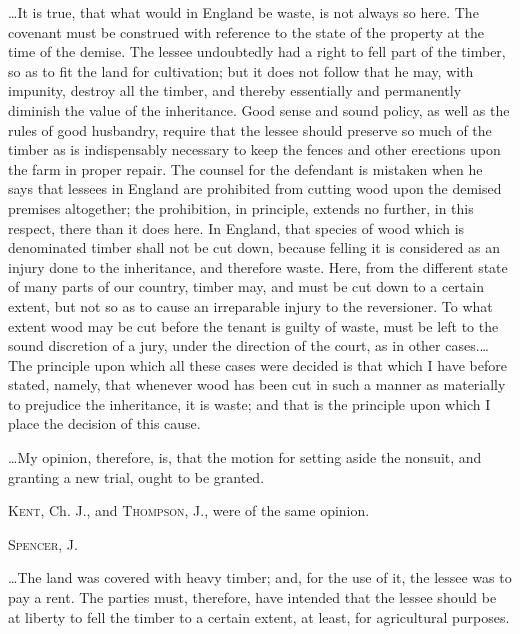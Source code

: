 \dots It is true, that what would in England be waste, is not always so here.
The covenant must be construed with reference to the state of the property at
the time of the demise. The lessee undoubtedly had a right to fell part of the
timber, so as to fit the land for cultivation; but it does not follow that he
may, with impunity, destroy all the timber, and thereby essentially and
permanently diminish the value of the inheritance. Good sense and sound policy,
as well as the rules of good husbandry, require that the lessee should preserve
so much of the timber as is indispensably necessary to keep the fences and
other erections upon the farm in proper repair. The counsel for the defendant
is mistaken when he says that lessees in England are prohibited from cutting
wood upon the demised premises altogether; the prohibition, in principle,
extends no further, in this respect, there than it does here. In England, that
species of wood which is denominated timber shall not be cut down, because
felling it is considered as an injury done to the inheritance, and therefore
waste. Here, from the different state of many parts of our country, timber may,
and must be cut down to a certain extent, but not so as to cause an irreparable
injury to the reversioner. To what extent wood may be cut before the tenant is
guilty of waste, must be left to the sound discretion of a jury, under the
direction of the court, as in other cases.\dots The principle upon which all
these cases were decided is that which I have before stated, namely, that
whenever wood has been cut in such a manner as materially to prejudice the
inheritance, it is waste; and that is the principle upon which I place the
decision of this cause.

\dots My opinion, therefore, is, that the motion for setting aside the nonsuit,
and granting a new trial, ought to be granted.

\opinion \textsc{Kent}, Ch. J., and \textsc{Thompson}, J., were of the same
opinion.

\opinion \textsc{Spencer}, J.

\dots The land was covered with heavy timber; and, for the use of it, the lessee
was to pay a rent. The parties must, therefore, have intended that the lessee
should be at liberty to fell the timber to a certain extent, at least, for
agricultural purposes.

